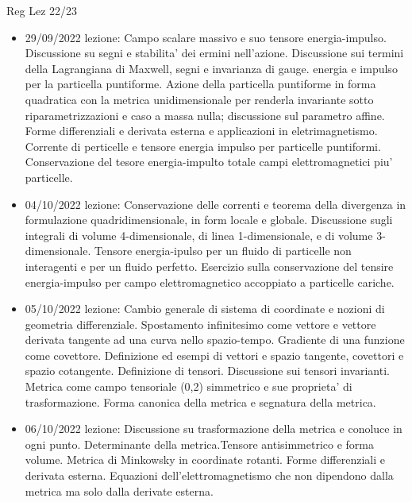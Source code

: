 \begin{frame}[allowframebreaks]{Reg Lez 22/23}
\begin{itemize}
\item 29/09/2022 lezione: Campo scalare massivo e suo tensore energia-impulso. Discussione su segni e stabilita' dei ermini nell'azione. Discussione sui termini della Lagrangiana di Maxwell, segni e invarianza di gauge. energia e impulso per la particella puntiforme. Azione della particella puntiforme in forma quadratica con la metrica unidimensionale per renderla invariante sotto riparametrizzazioni e caso a massa nulla; discussione sul parametro affine. Forme differenziali e derivata esterna e applicazioni in eletrimagnetismo. Corrente di perticelle e tensore energia impulso per particelle puntiformi. Conservazione del tesore energia-impulto totale campi elettromagnetici piu' particelle.
\item 04/10/2022 lezione: Conservazione delle correnti e teorema della divergenza in formulazione quadridimensionale, in form locale e globale. Discussione sugli integrali di volume 4-dimensionale, di linea 1-dimensionale, e di volume 3-dimensionale. Tensore energia-ipulso per un fluido di particelle non interagenti e per un fluido perfetto. Esercizio sulla conservazione del tensire energia-impulso per campo elettromagnetico accoppiato a particelle cariche.
\item 05/10/2022 lezione: Cambio generale di sistema di coordinate e nozioni di geometria differenziale. Spostamento infinitesimo come vettore e vettore derivata tangente ad una curva nello spazio-tempo. Gradiente di una funzione come covettore. Definizione ed esempi di vettori e spazio tangente, covettori e spazio cotangente. Definizione di tensori. Discussione sui tensori invarianti. Metrica come campo tensoriale (0,2) simmetrico e sue proprieta' di trasformazione. Forma canonica della metrica e segnatura della metrica.
\item 06/10/2022 lezione: Discussione su trasformazione della metrica e conoluce in ogni punto. Determinante della metrica.Tensore antisimmetrico e forma volume. Metrica di Minkowsky in coordinate rotanti. Forme differenziali e derivata esterna. Equazioni dell'elettromagnetismo che non dipendono dalla metrica ma solo dalla derivate esterna.
    \end{itemize}
   \end{frame} 